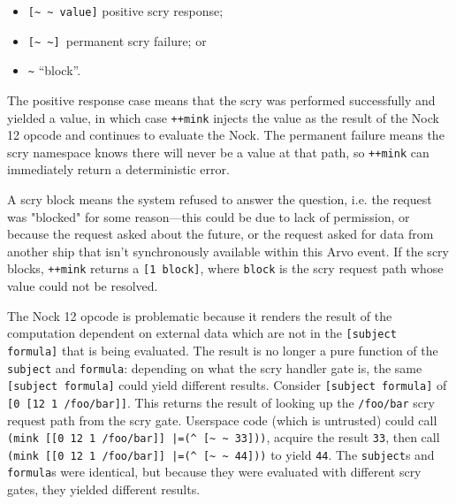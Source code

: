 \documentclass[twoside]{article}
\begin{document}
\begin{itemize}
  \item  \lstinline[style=inlinecode]{[~ ~ value]} positive scry response;
  \item  \lstinline[style=inlinecode]{[~ ~] }permanent scry failure; or
  \item  \lstinline[style=inlinecode]{~} ``block''.
\end{itemize}

\noindent
The positive response case means that the scry was performed successfully and yielded a value, in which case \lstinline[style=inlinecode]{++mink} injects the value as the result of the Nock 12 opcode and continues to evaluate the Nock.  The permanent failure means the scry namespace knows there will never be a value at that path, so \lstinline[style=inlinecode]{++mink} can immediately return a deterministic error.

A scry block means the system refused to answer the question, i.e. the request was "blocked" for some reason—this could be due to lack of permission, or because the request asked about the future, or the request asked for data from another ship that isn't synchronously available within this Arvo event. If the scry blocks, \lstinline[style=inlinecode]{++mink} returns a \lstinline[style=inlinecode]{[1 block]}, where \lstinline[style=inlinecode]{block} is the scry request path whose value could not be resolved.

The Nock 12 opcode is problematic because it renders the result of the computation dependent on external data which are not in the \lstinline[style=inlinecode]{[subject formula]} that is being evaluated.  The result is no longer a pure function of the \lstinline[style=inlinecode]{subject} and \lstinline[style=inlinecode]{formula}:  depending on what the scry handler gate is, the same \lstinline[style=inlinecode]{[subject formula]} could yield different results.  Consider \lstinline[style=inlinecode]{[subject formula]} of \lstinline[style=inlinecode]{[0 [12 1 /foo/bar]]}.  This returns the result of looking up the \lstinline[style=inlinecode]{/foo/bar} scry request path from the scry gate. Userspace code (which is untrusted) could call \lstinline[style=inlinecode]{(mink [[0 12 1 /foo/bar]] |=(^ [~ ~ 33]))}, acquire the result \lstinline[style=inlinecode]{33}, then call \lstinline[style=inlinecode]{(mink [[0 12 1 /foo/bar]] |=(^ [~ ~ 44]))} to yield \lstinline[style=inlinecode]{44}.  The \lstinline[style=inlinecode]{subject}s and \lstinline[style=inlinecode]{formula}s were identical, but because they were evaluated with different scry gates, they yielded different results.
\end{document}
